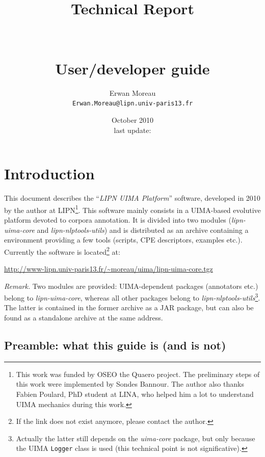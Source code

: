 \documentclass{article}
\author{Erwan Moreau\\ {\tt Erwan.Moreau@lipn.univ-paris13.fr}}
\title{{\sf Technical Report \\ \ \\ \softName \versionSoft\\ User/developer guide }}
\date{October 2010 \\ {\small last update: \dateLastUpdate}}
\newcommand{\softName}{{\em LIPN UIMA Platform}\xspace}
\newcommand{\archiveName}{lipn-uima-core.tgz}
\newcommand{\urlVersionStable}{http://www-lipn.univ-paris13.fr/~moreau/uima/\archiveName}
\newcommand{\uimaModule}{{\em lipn-uima-core}\xspace}
\newcommand{\utilsModule}{{\em lipn-nlptools-utils}\xspace}
\begin{document}
\maketitle

\tableofcontents

\newpage


\section{Introduction}

This document describes the ``\softName'' software, developed in 2010 by the author at LIPN\footnote{This work was funded by OSEO the Quaero project. The preliminary steps of this work were implemented by Sondes Bannour. The author also thanks Fabien Poulard, PhD student at LINA, who helped him a lot to understand UIMA mechanics during this work.}. This software mainly consists in a UIMA-based evolutive platform devoted to corpora annotation. It is divided into two modules (\uimaModule and \utilsModule) and is distributed as an archive containing a environment providing a few tools (scripts, CPE descriptors, examples etc.). Currently the software is located\footnote{If the link does not exist anymore, please contact the author.} at:

\begin{center}
\url{\urlVersionStable}
\end{center}


\label{partModulesDescription}
{\em Remark.} Two modules are provided: UIMA-dependent packages (annotators etc.) belong to \uimaModule, whereas all other packages belong to \utilsModule\footnote{Actually the latter still depends on the {\em uima-core} package, but only because the UIMA {\tt Logger} class is used (this technical point is not significative).}. The latter is contained in the former archive as a JAR package, but can also be found as a standalone archive at the same address.



\subsection{Preamble: what this guide is (and is not)}
\end{document}
